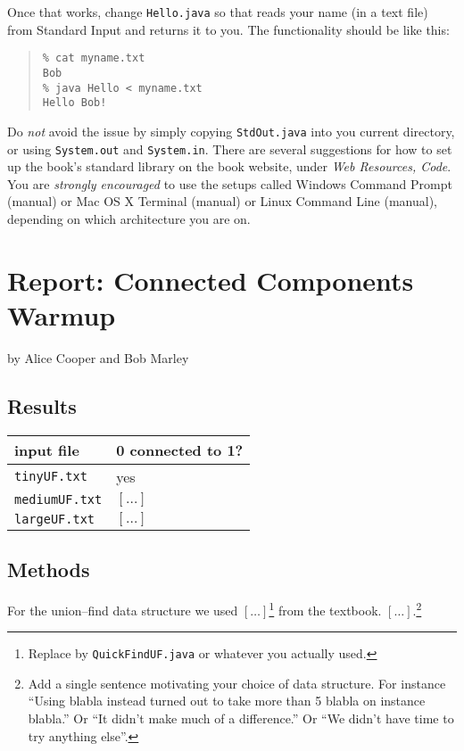 \documentclass{tufte-handout}
\begin{document}
Once that works, change {\tt Hello.java} so that reads your name (in a text file) from Standard Input and returns it to you.
The functionality should be like this:

\begin{quotation}
\begin{verbatim}
% cat myname.txt
Bob
% java Hello < myname.txt
Hello Bob!
\end{verbatim}
\end{quotation}

Do \emph{not} avoid the issue by simply copying {\tt StdOut.java} into you current directory, or using {\tt System.out} and {\tt System.in}.
There are several suggestions for how to set up the book's standard library on the book website, under \emph{Web Resources, Code}.
You are \emph{strongly encouraged} to use the setups called Windows Command Prompt (manual) or Mac OS X Terminal (manual) or Linux Command Line (manual), depending on which architecture you are on.

\newpage
\section{Report: Connected Components Warmup}


by Alice Cooper and Bob Marley


\subsection{Results}

\begin{tabular}{ll}
  \toprule
  input file & 0 connected to 1? \\
  \midrule
  {\tt tinyUF.txt} & yes \\
  {\tt mediumUF.txt} & $[\ldots]$ \\
  {\tt largeUF.txt} & $[\ldots]$ \\
  \bottomrule
\end{tabular}

\subsection{Methods}

For the union--find data structure we used  $[\ldots]$\footnote{Replace by {\tt QuickFindUF.java} or whatever you actually used.}
from the textbook. 
$[\dots]$.\footnote{Add a single sentence motivating your choice of data structure. 
For instance ``Using blabla instead turned out to take more than 5  blabla on instance blabla.''
Or ``It didn't make much of a difference.''
Or ``We didn't have time to try anything else''.}
\end{document}
